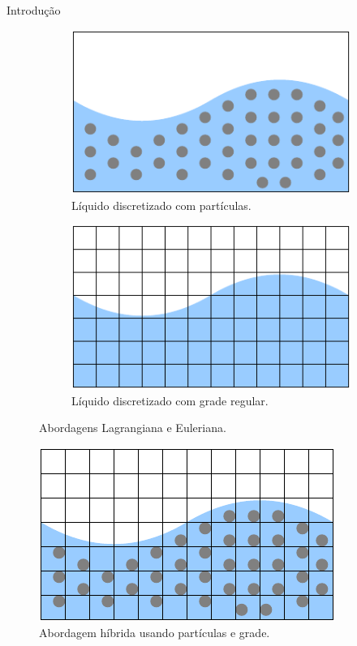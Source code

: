 \documentclass[aspectratio=169,xcolor=dvipsnames]{beamer}
\begin{document}
\begin{frame}{Introdução}
    {
    \begin{figure}
        \begin{subfigure}{0.4\linewidth}
            \includegraphics[width=\linewidth]{figures/LagrangianFramework.pdf}
            \caption{Líquido discretizado com partículas.}
        \end{subfigure}
        \begin{subfigure}{0.4\linewidth}
            \includegraphics[width=\linewidth]{figures/EulerianFramework.pdf}
            \caption{Líquido discretizado com grade regular.}
        \end{subfigure}
        \centering
        \caption{Abordagens Lagrangiana e Euleriana.}
        \label{fig:frameworks}
    \end{figure}
    }
    
    {
        \begin{figure}
            \centering
            \includegraphics{figures/HybridFramework.pdf}
            \caption{Abordagem híbrida usando partículas e grade.}
            \label{fig:hybridframework}
        \end{figure}
    }
    

\end{frame}
\end{document}
